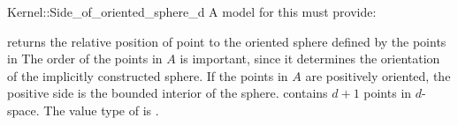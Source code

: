 \begin{ccRefFunctionObjectConcept}{Kernel::Side_of_oriented_sphere_d}
A model for this must provide:


 {returns the relative position of point
   to the oriented sphere defined by the points in \ccc{A =
    tuple [first,last)} The order of the points in $A$ is important,
  since it determines the orientation of the implicitly constructed
  sphere.  If the points in $A$ are positively oriented, the positive
  side is the bounded interior of the sphere.  \ccPrecond {}
  contains $d+1$ points in $d$-space.  \ccRequire The value type of
   is .}

\end{ccRefFunctionObjectConcept}
